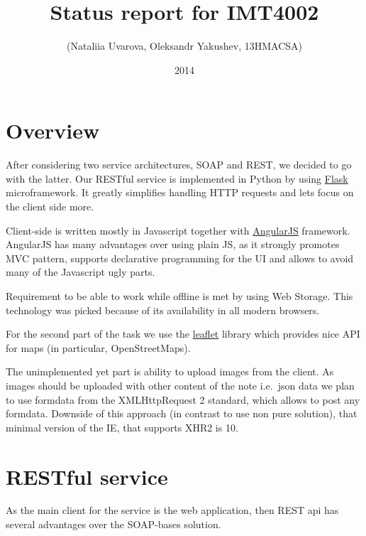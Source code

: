 \documentclass[12pt,a4paper]{article}
\begin{document}
\lstset{
numbers=left,
tabsize=4,
breaklines=true,
title=\lstname,
}
\title{Status report for IMT4002}
\author{(Nataliia Uvarova, Oleksandr Yakushev, 13HMACSA)}
\date{2014}
\maketitle
\onehalfspacing

\section{Overview}
After considering two service architectures, SOAP and REST, we decided to go with the latter.
Our RESTful service is implemented in Python by using \href{http://flask.pocoo.org/}{Flask} microframework.
It greatly simplifies handling HTTP requests and lets focus on the client side more.

Client-side is written mostly in Javascript together with \href{http://www.angularjs.org/}{AngularJS} framework.
AngularJS has many advantages over using plain JS, as it strongly promotes MVC pattern,
supports declarative programming for the UI and allows to avoid many of the Javascript ugly parts.

Requirement to be able to work while offline is met by using Web Storage.
This technology was picked because of its availability in all modern browsers.

For the second part of the task we use the \href{http://leafletjs.com/}{leaflet} library
which provides nice API for maps (in particular, OpenStreetMaps).

The unimplemented yet part is ability to upload images from the client. As images should be
uploaded with other content of the note i.e.\  json data we plan to use formdata from
the XMLHttpRequest 2 standard, which allows to post any formdata. Downside of this approach (in contrast to use
non pure solution), that minimal version of the IE, that supports XHR2 is 10.

\section{RESTful service}
As the main client for the service is the web application, then REST api has
several advantages over the SOAP-bases solution.
\end{document}
